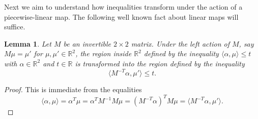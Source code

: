 \documentclass[pdflatex,sn-mathphys]{sn-jnl}%
\theoremstyle{thmstyleone}%
\newtheorem{lemma}[theorem]{Lemma}
\theoremstyle{thmstyletwo}%
\theoremstyle{thmstylethree}%
\newcommand{\RR}{\mathbb{R}}
\begin{document}
  Next we aim to understand how inequalities transform under the action of a piecewise-linear map.
  The following well known fact about linear maps will suffice.

  \begin{lemma}
    \label{le:transformed inequalities}
    Let $M$ be an invertible $2\times 2$ matrix.
    Under the left action of $M$, say $M\mu=\mu'$ for $\mu,\mu'\in\RR^2$, the region inside $\RR^2$ defined by the inequality $\langle\alpha,\mu\rangle \le t$ with $\alpha\in\RR^2$ and $t\in\RR$ is transformed into the region defined by the inequality 
    \[
      \langle M^{-T}\alpha,\mu'\rangle\le t.
    \]
  \end{lemma}
  \begin{proof}
    This is immediate from the equalities
    \[
      \langle \alpha,\mu\rangle
      =
      \alpha^T\mu
      =
      \alpha^TM^{-1}M\mu
      =
      (M^{-T}\alpha)^TM\mu
      =
      \langle M^{-T}\alpha,\mu'\rangle.
    \]
  \end{proof}
 
\end{document}
